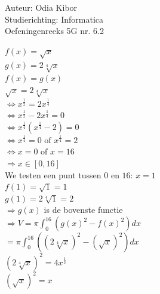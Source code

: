 \documentclass[a4paper]{article}
\begin{document}
  
\noindent \large Auteur: Odia Kibor \\
\noindent \large Studierichting: Informatica\\
\noindent \large Oefeningenreeks 5G nr. 6.2
\\

\medskip

\normalsize


$ f(x) = \sqrt{x} $\\

$ g(x) = 2\sqrt[4]{x} $\\

$ f(x) = g(x) $\\

$ \sqrt{x} = 2\sqrt[4]{x} $\\

$ \Leftrightarrow x^{\frac{1}{2}} = 2x^{\frac{1}{4}} $\\

$ \Leftrightarrow x^{\frac{1}{2}} - 2x^{\frac{1}{4}} = 0 $\\

$ \Leftrightarrow x^{\frac{1}{4}}\left(x^{\frac{1}{4}} - 2\right) = 0 $\\

$ \Leftrightarrow x^{\frac{1}{4}} = 0 \text{ of } x^{\frac{1}{4}} = 2 $\\

$ \Leftrightarrow x = 0 \text{ of } x = 16 $\\

$\Rightarrow x \in [0, 16]$\\

We testen een punt tussen $0$ en $16$: $x = 1$\\

$ f(1) = \sqrt{1} = 1 $\\

$ g(1) = 2\sqrt[4]{1} = 2 $\\

$\Rightarrow g(x)$ is de bovenste functie\\

$\Rightarrow V = \pi \displaystyle\int_0^{16} \left(g(x)^2 - f(x)^2\right)dx$\\

$= \pi \displaystyle\int_0^{16} \left((2\sqrt[4]{x})^2 - (\sqrt{x})^2\right)dx$\\

$(2\sqrt[4]{x})^2 = 4x^{\frac{1}{2}}$\\

$(\sqrt{x})^2 = x$\\
\end{document}
